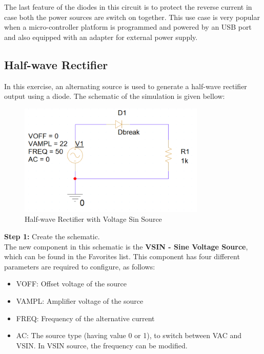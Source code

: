 The last feature of the diodes in this circuit is  to protect the reverse current in case both the power sources are switch on together. This use case is very popular when a micro-controller platform is programmed and powered by an USB port and also equipped with an adapter for external power supply.

\subsection{Half-wave Rectifier}\label{halfwaveRectifier}
In this exercise, an alternating source is used to generate a half-wave rectifier output using a diode. The schematic of the simulation is given bellow:

\begin{figure}[!htp]
    \label{pic:halfwave_rectifier3}
    \centering
    \includegraphics[width = 3.5in]{source/picture/bai_2/diode_6.PNG}
    \caption{Half-wave Rectifier with Voltage Sin Source}
    \label{lab02_ex031e}
\end{figure}

\textbf{Step 1: } Create the schematic.\\
The new component in this schematic is the \textbf{VSIN - Sine Voltage Source}, which can be found in the Favorites list. This component has four different parameters are required to configure, as follows:
\begin{itemize}
    \item VOFF: Offset voltage of the source
    \item VAMPL: Amplifier voltage of the source
    \item FREQ: Frequency of the alternative current
    \item AC: The source type (having value 0 or 1), to switch between VAC and VSIN. In VSIN source, the frequency can be modified.
\end{itemize}

